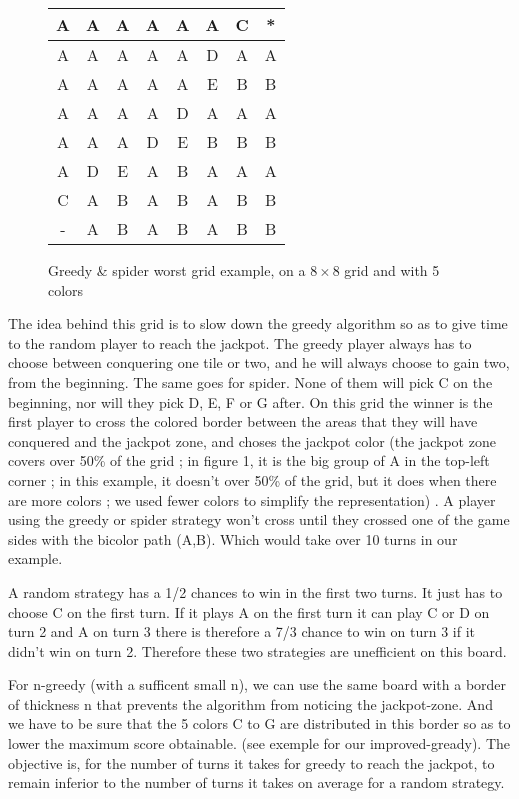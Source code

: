 \documentclass[a4paper]{article}
\begin{document}
\begin{figure}[b]
\begin{center}
\begin{tabular}{|c|c|c|c|c|c|c|c|}
\hline
	A & A & A & A & A & A & C & * \\
\hline
	A & A & A & A & A & D & A & A \\
\hline
	A & A & A & A & A & E & B & B \\
\hline
	A & A & A & A & D & A & A & A \\
\hline
	A & A & A & D & E & B & B & B \\
\hline
	A & D & E & A & B & A & A & A \\
\hline
	C & A & B & A & B & A & B & B \\
\hline
	- & A & B & A & B & A & B & B \\
\hline
\end{tabular}
\end{center}
\caption{Greedy \& spider worst grid example, on a $8 \times 8$ grid and with 5 colors}
\end{figure}


The idea behind this grid is to slow down the greedy algorithm so as to give time to the random player to reach the jackpot.
The greedy player always has to choose between conquering one tile or two, and he will always choose to gain two, from the beginning. The same goes for spider. None of them will pick C on the beginning, nor will they pick D, E, F or G after.
On this grid the winner is the first player to cross the colored border between the areas that they will have conquered and the jackpot zone, and choses the jackpot color (the jackpot zone covers
 over 50\% of the grid ; in figure 1, it is the big group of A in the top-left corner ; in this example, it doesn't over 50\% of the grid, but it does when there are more colors ; we used fewer colors to simplify the representation) .
A player using the greedy or spider strategy won't cross until they crossed one of the game sides with the bicolor path (A,B).
 Which would take over 10 turns in our example.

A random strategy has a 1/2 chances to win in the first two turns. It just has to choose C on the first turn.
If it plays A on the first turn it can play C or D on turn 2 and A on turn 3 there is therefore a 7/3 chance to win on turn 3 
if it didn't win on turn 2.
Therefore these two strategies are unefficient on this board.

For n-greedy (with a sufficent small n), we can use the same board with a border of thickness n that prevents the algorithm
from noticing the jackpot-zone. And we have to be sure that the 5 colors C to G are distributed in this border so as to lower the maximum score obtainable.
(see exemple for our improved-gready).
 The objective is, for the number of turns it takes for greedy to reach the jackpot, to remain inferior to the number of turns
 it takes on average for a random strategy.
 
\end{document}
